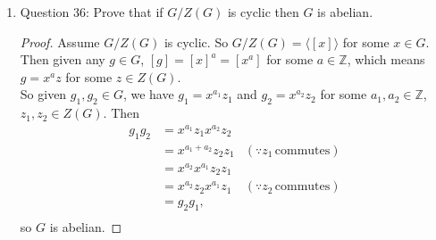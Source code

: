 \documentclass{article}
\begin{document}
\begin{enumerate}
\begin{enumerate}
      \item Question 36: Prove that if $G/Z(G)$ is cyclic then $G$ is
        abelian.
        \begin{proof}
          Assume $G/Z(G)$ is cyclic. So $G/Z(G)=\langle[x]\rangle$ for some
          $x\in G$. Then given any $g\in G$, $[g]=[x]^a=[x^a]$ for some
          $a\in\mathbb{Z}$, which means $g=x^az$ for some $z\in Z(G)$. \\

          So given $g_1,g_2\in G$, we have $g_1=x^{a_1}z_1$ and
          $g_2=x^{a_2}z_2$ for some $a_1,a_2\in\mathbb{Z}$, $z_1,z_2\in
          Z(G)$. Then
          \begin{align*}
            g_1g_2  &= x^{a_1}z_1x^{a_2}z_2 & \\
                    &= x^{a_1+a_2}z_2z_1    & (\because z_1\,
                    \text{commutes}) \\
                    &= x^{a_2}x^{a_1}z_2z_1 & \\
                    &= x^{a_2}z_2x^{a_1}z_1 & (\because z_2\,
                    \text{commutes}) \\
                    &= g_2g_1,              & \\
          \end{align*}
          so $G$ is abelian.
        \end{proof}
    \end{enumerate}
\end{enumerate}
\end{document}
